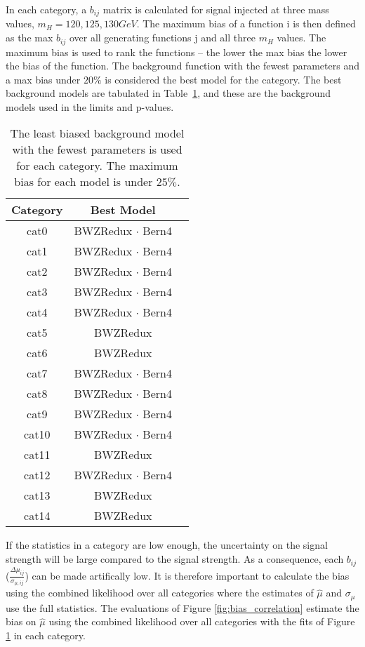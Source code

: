 In each category, a $b_{ij}$ matrix is calculated for signal injected at three mass values, $m_H = 120, 125, 130 GeV$. The maximum bias of a function i is then defined as the max $b_{ij}$ over all generating functions j and all three $m_H$ values. The maximum bias is used to rank the functions -- the lower the max bias the lower the bias of the function. The background function with the fewest parameters and a max bias under $20\%$ is considered the best model for the category. The best background models are tabulated in Table~\ref{tab:bias}, and these are the background models used in the limits and p-values. 
\begin{table}[h!]
    \centering
    \caption[The background model for each category.]{The least biased background model with the fewest parameters is used for each category. The maximum bias for each model is under $25\%$.}
    \label{tab:bias}
    \begin{tabular}{ccc}
        \hline
        Category & Best Model           \\
        \hline
        cat0  & BWZRedux $\cdot$ Bern4  \\
        cat1  & BWZRedux $\cdot$ Bern4  \\
        cat2  & BWZRedux $\cdot$ Bern4  \\
        cat3  & BWZRedux $\cdot$ Bern4  \\
        cat4  & BWZRedux $\cdot$ Bern4  \\
        cat5  & BWZRedux                \\
        cat6  & BWZRedux                \\
        cat7  & BWZRedux $\cdot$ Bern4  \\
        cat8  & BWZRedux $\cdot$ Bern4  \\
        cat9  & BWZRedux $\cdot$ Bern4  \\
        cat10 & BWZRedux $\cdot$ Bern4  \\
        cat11 & BWZRedux                \\
        cat12 & BWZRedux $\cdot$ Bern4  \\
        cat13 & BWZRedux                \\
        cat14 & BWZRedux                \\
        \hline
    \end{tabular}
\end{table}
If the statistics in a category are low enough, the uncertainty on the signal strength will be large compared to the signal strength. As a consequence, each $b_{ij}$ ($\frac{\Delta\mu_{ij}}{\sigma_{\mu,ij}}$) can be made artifically low. It is therefore important to calculate the bias using the combined likelihood over all categories where the estimates of $\hat{\mu}$ and $\sigma_\mu$ use the full statistics. The evaluations of Figure \ref{fig:bias_correlation} estimate the bias on $\hat{\mu}$ using the combined likelihood over all categories with the fits of Figure \ref{tab:bias} in each category.  
